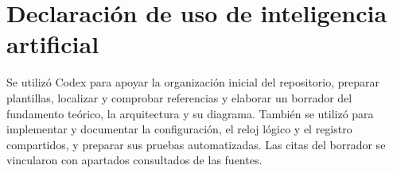 \section{Declaración de uso de inteligencia artificial}
Se utilizó Codex para apoyar la organización inicial del repositorio, preparar
plantillas, localizar y comprobar referencias y elaborar un borrador del fundamento
teórico, la arquitectura y su diagrama. También se utilizó para implementar y
documentar la configuración, el reloj lógico y el registro compartidos, y preparar
sus pruebas automatizadas. Las citas del borrador se vincularon con apartados consultados de las
fuentes.
